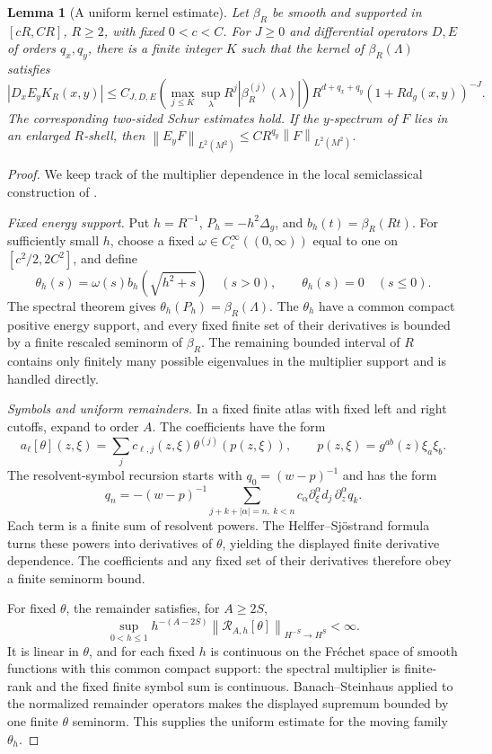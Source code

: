 \documentclass[11pt,a4paper]{amsart}
\numberwithin{equation}{section}
\newtheorem{lemma}[theorem]{Lemma}
\theoremstyle{definition}
\theoremstyle{remark}
\newcommand{\norm}[1]{\left\lVert#1\right\rVert}
\begin{document}
\begin{lemma}[A uniform kernel estimate]\label{lem:spectralkernel}
Let $\beta_R$ be smooth and supported in $[cR,CR]$, $R\ge2$, with fixed $0<c<C$. For $J\ge0$ and differential operators $D,E$ of orders $q_x,q_y$, there is a finite integer $K$ such that the kernel of $\beta_R(\Lambda)$ satisfies
\begin{equation}\label{eq:spectralkernel}
 |D_xE_yK_R(x,y)|\le C_{J,D,E}
 \left(\max_{j\le K}\sup_\lambda R^j|\beta_R^{(j)}(\lambda)|\right)
 R^{d+q_x+q_y}(1+Rd_g(x,y))^{-J}.
\end{equation}
The corresponding two-sided Schur estimates hold. If the $y$-spectrum of $F$ lies in an enlarged $R$-shell, then
$\norm{E_yF}_{L^2(M^2)}\le CR^{q_y}\norm F_{L^2(M^2)}$.
\end{lemma}
\begin{proof}
We keep track of the multiplier dependence in the local semiclassical construction of \cite[Proposition~2.2(i), equation~(2.12), and Remark~2.3]{ORT}.

\emph{Fixed energy support.} Put $h=R^{-1}$, $P_h=-h^2\Delta_g$, and $b_h(t)=\beta_R(Rt)$. For sufficiently small $h$, choose a fixed $\omega\in C_c^\infty((0,\infty))$ equal to one on $[c^2/2,2C^2]$, and define
\[
 \theta_h(s)=\omega(s)b_h(\sqrt{h^2+s})\quad(s>0),\qquad \theta_h(s)=0\quad(s\le0).
\]
The spectral theorem gives $\theta_h(P_h)=\beta_R(\Lambda)$. The $\theta_h$ have a common compact positive energy support, and every fixed finite set of their derivatives is bounded by a finite rescaled seminorm of $\beta_R$. The remaining bounded interval of $R$ contains only finitely many possible eigenvalues in the multiplier support and is handled directly.

\emph{Symbols and uniform remainders.} In a fixed finite atlas with fixed left and right cutoffs, expand to order $A$. The coefficients have the form
\[
 a_\ell[\theta](z,\xi)=\sum_jc_{\ell,j}(z,\xi)\theta^{(j)}(p(z,\xi)),
 \qquad p(z,\xi)=g^{ab}(z)\xi_a\xi_b.
\]
The resolvent-symbol recursion starts with $q_0=(w-p)^{-1}$ and has the form
\[
 q_n=-(w-p)^{-1}\!
 \sum_{j+k+|\alpha|=n,\ k<n}
 c_\alpha\partial_\xi^\alpha d_j\,\partial_z^\alpha q_k.
\]
Each term is a finite sum of resolvent powers. The Helffer--Sj\"ostrand formula turns these powers into derivatives of $\theta$, yielding the displayed finite derivative dependence. The coefficients and any fixed set of their derivatives therefore obey a finite seminorm bound.

For fixed $\theta$, the remainder satisfies, for $A\ge2S$,
\[
 \sup_{0<h\le1}h^{-(A-2S)}
 \norm{\mathcal R_{A,h}[\theta]}_{H^{-S}\to H^S}<\infty.
\]
It is linear in $\theta$, and for each fixed $h$ is continuous on the Fr\'echet space of smooth functions with this common compact support: the spectral multiplier is finite-rank and the fixed finite symbol sum is continuous. Banach--Steinhaus applied to the normalized remainder operators makes the displayed supremum bounded by one finite $\theta$ seminorm. This supplies the uniform estimate for the moving family $\theta_h$.


\end{proof}
\end{document}
